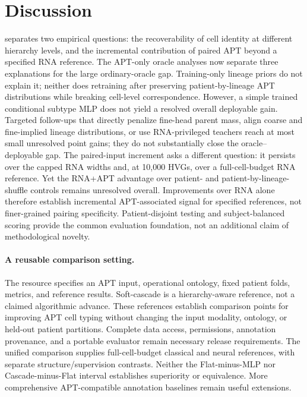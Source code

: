 \section{Discussion}
\label{sec:discussion}

\ourbench{} separates two empirical questions: the recoverability of cell
identity at different hierarchy levels, and the incremental contribution of
paired APT beyond a specified RNA reference. The APT-only oracle analyses now
separate three explanations for the large ordinary-oracle gap. Training-only
lineage priors do not explain it; neither does retraining after preserving
patient-by-lineage APT distributions while breaking cell-level correspondence.
However, a simple trained conditional subtype MLP does not yield a resolved
overall deployable gain. Targeted follow-ups that directly penalize fine-head
parent mass, align coarse and fine-implied lineage distributions, or use
RNA-privileged teachers reach at most small unresolved point gains; they do not
substantially close the oracle--deployable gap. The paired-input increment asks
a different question: it persists over the capped RNA widths and, at 10{,}000
HVGs, over a full-cell-budget RNA reference. Yet the RNA+APT advantage over
patient- and patient-by-lineage-shuffle controls remains unresolved overall.
Improvements over RNA alone therefore establish incremental APT-associated
signal for specified references, not finer-grained pairing specificity.
Patient-disjoint testing and subject-balanced scoring provide the common
evaluation foundation, not an additional claim of methodological novelty.

\paragraph{A reusable comparison setting.}
The resource specifies an APT input, operational ontology, fixed patient folds,
metrics, and reference results. Soft-cascade is a hierarchy-aware reference,
not a claimed algorithmic advance. These references establish comparison
points for improving APT cell typing without changing the input modality,
ontology, or held-out patient partitions. Complete data access, permissions,
annotation provenance, and a portable evaluator remain necessary release
requirements. The unified comparison supplies full-cell-budget classical and neural
references, with separate structure/supervision contrasts. Neither the
Flat-minus-MLP nor Cascade-minus-Flat interval establishes superiority or
equivalence. More comprehensive APT-compatible annotation baselines remain
useful extensions.

